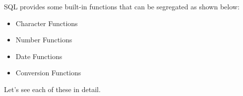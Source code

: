 \setlength{\columnsep}{3pt}
\begin{flushleft}
	
	SQL provides some built-in functions that can be segregated as shown below:
	\begin{itemize}
		\item Character Functions
		\item Number Functions
		\item Date Functions
		\item Conversion Functions
	\end{itemize}
	
	Let's see each of these in detail.
		
\end{flushleft}
\newpage